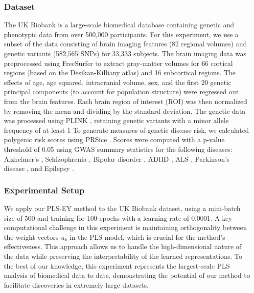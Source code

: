 \subsubsection{Dataset}
The UK Biobank is a large-scale biomedical database containing genetic and phenotypic data from over 500,000 participants. For this experiment, we use a subset of the data consisting of brain imaging features (82 regional volumes) and genetic variants (582,565 SNPs) for 33,333 subjects.
The brain imaging data was preprocessed using FreeSurfer \citep{Fischl2012} to extract gray-matter volumes for 66 cortical regions (based on the Desikan-Killiany atlas) and 16 subcortical regions. The effects of age, age squared, intracranial volume, sex, and the first 20 genetic principal components (to account for population structure) were regressed out from the brain features. Each brain region of interest (ROI) was then normalized by removing the mean and dividing by the standard deviation.
The genetic data was processed using PLINK \citep{Purcell2007}, retaining genetic variants with a minor allele frequency of at least 1%
To generate measures of genetic disease risk, we calculated polygenic risk scores using PRSice \citep{PRSice2014}. Scores were computed with a p-value threshold of 0.05 using GWAS summary statistics for the following diseases: Alzheimer's \citep{Lambert2013}, Schizophrenia \citep{Trubetskoy2022}, Bipolar disorder \citep{Mullins2021}, ADHD \citep{Demontis2023}, ALS \citep{Van_Rheenen2021}, Parkinson's disease \citep{Nalls2019}, and Epilepsy \citep{International_League_Against_Epilepsy_Consortium_on_Complex_Epilepsies2018}.
\subsubsection{Experimental Setup}
We apply our PLS-EY method to the UK Biobank dataset, using a mini-batch size of 500 and training for 100 epochs with a learning rate of 0.0001. A key computational challenge in this experiment is maintaining orthogonality between the weight vectors $u_k$ in the PLS model, which is crucial for the method's effectiveness.
This approach allows us to handle the high-dimensional nature of the data while preserving the interpretability of the learned representations. To the best of our knowledge, this experiment represents the largest-scale PLS analysis of biomedical data to date, demonstrating the potential of our method to facilitate discoveries in extremely large datasets.
